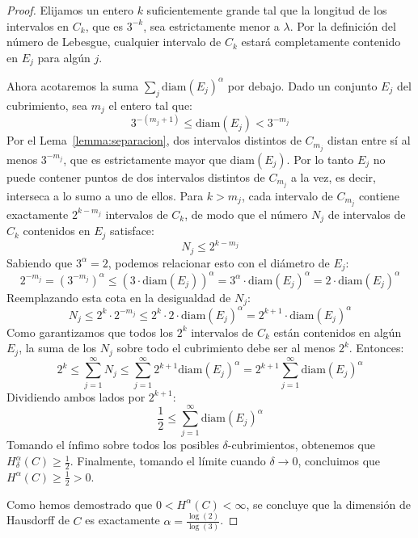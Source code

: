 \documentclass[12pt,a4paper]{article}
\theoremstyle{plain}
\theoremstyle{profesional}
\theoremstyle{definicion-style}
\begin{document}
\begin{proof}
	Elijamos un entero \( k \) suficientemente grande tal que la longitud de los intervalos en \( C_k \), que es \( 3^{-k} \), sea estrictamente menor a \( \lambda \). Por la definición del número de Lebesgue, cualquier intervalo de \( C_k \) estará completamente contenido en \( E_j \) para algún \( j \).

	Ahora acotaremos la suma \( \sum_j {\text{diam}(E_j)}^\alpha \) por debajo. Dado un conjunto \( E_j \) del cubrimiento, sea \( m_j \) el entero tal que:
	\[
		3^{-(m_j+1)} \le \text{diam}(E_j) < 3^{-m_j}
	\]
	Por el Lema~\ref{lemma:separacion}, dos intervalos distintos de \( C_{m_j} \) distan entre sí al menos \( 3^{-m_j} \), que es estrictamente mayor que \( \text{diam}(E_j) \). Por lo tanto \( E_j \) no puede contener puntos de dos intervalos distintos de \( C_{m_j} \) a la vez, es decir, interseca a lo sumo a uno de ellos. Para \( k > m_j \), cada intervalo de \( C_{m_j} \) contiene exactamente \( 2^{k-m_j} \) intervalos de \( C_k \), de modo que el número \( N_j \) de intervalos de \( C_k \) contenidos en \( E_j \) satisface:
	\[
		N_j \le 2^{k-m_j}
	\]
	Sabiendo que \( 3^\alpha = 2 \), podemos relacionar esto con el diámetro de \( E_j \):
	\[
		2^{-m_j} = {(3^{-m_j})}^\alpha \le {(3 \cdot {\text{diam}(E_j)})}^\alpha = 3^\alpha \cdot {\text{diam}(E_j)}^\alpha = 2 \cdot {\text{diam}(E_j)}^\alpha
	\]
	Reemplazando esta cota en la desigualdad de \( N_j \):
	\[
		N_j \le 2^{k} \cdot 2^{-m_j} \le 2^{k} \cdot 2 \cdot {\text{diam}(E_j)}^\alpha = 2^{k+1} \cdot {\text{diam}(E_j)}^\alpha
	\]
	Como garantizamos que todos los \( 2^k \) intervalos de \( C_k \) están contenidos en algún \( E_j \), la suma de los \( N_j \) sobre todo el cubrimiento debe ser al menos \( 2^k \). Entonces:
	\[
		2^k \le \sum_{j=1}^\infty N_j \le \sum_{j=1}^\infty 2^{k+1} {\text{diam}(E_j)}^\alpha = 2^{k+1} \sum_{j=1}^\infty {\text{diam}(E_j)}^\alpha
	\]
	Dividiendo ambos lados por \( 2^{k+1} \):
	\[
		\frac{1}{2} \le \sum_{j=1}^\infty {\text{diam}(E_j)}^\alpha
	\]
	Tomando el ínfimo sobre todos los posibles \( \delta \)-cubrimientos, obtenemos que \( H_\delta^\alpha( C ) \ge \frac{1}{2} \). Finalmente, tomando el límite cuando \( \delta \to 0 \), concluimos que \( H^\alpha( C ) \ge \frac{1}{2} > 0 \).

	Como hemos demostrado que \( 0 < H^\alpha( C ) < \infty \), se concluye que la dimensión de Hausdorff de \( C \) es exactamente \( \alpha = \frac{\log(2)}{\log(3)} \).
\end{proof}
\end{document}

